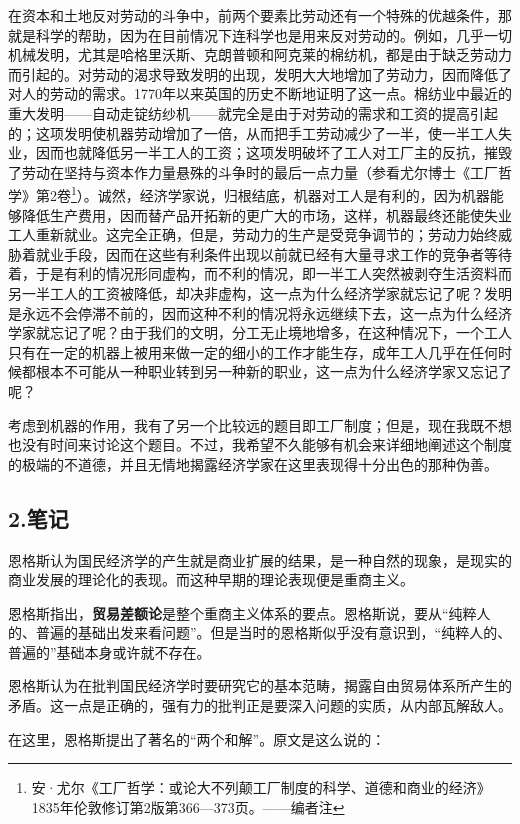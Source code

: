 \documentclass[a4paper,twoside,12pt,AutoFakeBold]{ctexart}
\begin{document}
在资本和土地反对劳动的斗争中，前两个要素比劳动还有一个特殊的优越条件，那就是科学的帮助，因为在目前情况下连科学也是用来反对劳动的。例如，几乎一切机械发明，尤其是哈格里沃斯、克朗普顿和阿克莱的棉纺机，都是由于缺乏劳动力而引起的。对劳动的渴求导致发明的出现，发明大大地增加了劳动力，因而降低了对人的劳动的需求。1770年以来英国的历史不断地证明了这一点。棉纺业中最近的重大发明——自动走锭纺纱机——就完全是由于对劳动的需求和工资的提高引起的；这项发明使机器劳动增加了一倍，从而把手工劳动减少了一半，使一半工人失业，因而也就降低另一半工人的工资；这项发明破坏了工人对工厂主的反抗，摧毁了劳动在坚持与资本作力量悬殊的斗争时的最后一点力量（参看尤尔博士《工厂哲学》第2卷\footnote{安·尤尔《工厂哲学：或论大不列颠工厂制度的科学、道德和商业的经济》1835年伦敦修订第2版第366—373页。——编者注}）。诚然，经济学家说，归根结底，机器对工人是有利的，因为机器能够降低生产费用，因而替产品开拓新的更广大的市场，这样，机器最终还能使失业工人重新就业。这完全正确，但是，劳动力的生产是受竞争调节的；劳动力始终威胁着就业手段，因而在这些有利条件出现以前就已经有大量寻求工作的竞争者等待着，于是有利的情况形同虚构，而不利的情况，即一半工人突然被剥夺生活资料而另一半工人的工资被降低，却决非虚构，这一点为什么经济学家就忘记了呢？发明是永远不会停滞不前的，因而这种不利的情况将永远继续下去，这一点为什么经济学家就忘记了呢？由于我们的文明，分工无止境地增多，在这种情况下，一个工人只有在一定的机器上被用来做一定的细小的工作才能生存，成年工人几乎在任何时候都根本不可能从一种职业转到另一种新的职业，这一点为什么经济学家又忘记了呢？

考虑到机器的作用，我有了另一个比较远的题目即工厂制度；但是，现在我既不想也没有时间来讨论这个题目。不过，我希望不久能够有机会来详细地阐述这个制度的极端的不道德，并且无情地揭露经济学家在这里表现得十分出色的那种伪善。 

\newpage

\subsection{2.笔记}
恩格斯认为国民经济学的产生就是商业扩展的结果，是一种自然的现象，是现实的商业发展的理论化的表现。而这种早期的理论表现便是重商主义。

恩格斯指出，\textbf{贸易差额论}是整个重商主义体系的要点。恩格斯说，要从“纯粹人的、普遍的基础出发来看问题”。但是当时的恩格斯似乎没有意识到，“纯粹人的、普遍的”基础本身或许就不存在。

恩格斯认为在批判国民经济学时要研究它的基本范畴，揭露自由贸易体系所产生的矛盾。这一点是正确的，强有力的批判正是要深入问题的实质，从内部瓦解敌人。

在这里，恩格斯提出了著名的“两个和解”。原文是这么说的：
\end{document}
